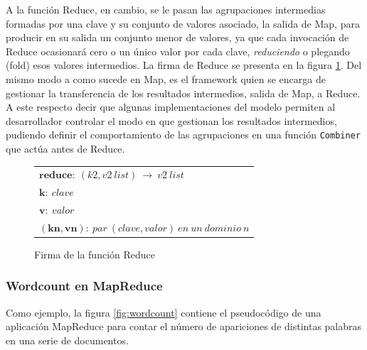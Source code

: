 A la funci\'on Reduce, en cambio, se le pasan las agrupaciones intermedias formadas por una clave y su conjunto de valores asociado, la salida de Map, para producir en su salida un conjunto menor de valores, ya que cada invocaci\'on de Reduce ocasionar\'a cero o un \'unico valor por cada clave, \emph{reduciendo} o plegando (fold) esos valores intermedios. La firma de Reduce se presenta en la figura \ref{fig:reduce}. Del mismo modo a como sucede en Map, es el framework quien se encarga de gestionar la transferencia de los resultados intermedios, salida de Map, a Reduce. A este respecto decir que algunas implementaciones del modelo permiten al desarrollador controlar el modo en que gestionan los resultados intermedios, pudiendo definir el comportamiento de las agrupaciones en una funci\'on \texttt{Combiner} que act\'ua antes de Reduce.

\begin{figure}[tbp]
\begin{center}
\begin{tabular}{|l|}
\hline
$\mathbf{reduce:} \: \left( k2,v2 \: list \right) \: \rightarrow \: v2 \: list$ \\
$\mathbf{k:} \: clave$ \\
$\mathbf{v:} \: valor$ \\
$\mathbf{\left(kn,vn \right):} \: par \: \left(clave,valor\right) \: en \: un \: dominio \: n$ \\
\hline
\end{tabular}
\caption{Firma de la funci\'on Reduce}
\label{fig:reduce}
\end{center}
\end{figure}


\subsubsection{Wordcount en MapReduce}\label{subsubsec:wordcount}
\noindent Como ejemplo, la figura \ref{fig:wordcount} contiene el pseudoc\'odigo de una aplicaci\'on MapReduce para contar el n\'umero de apariciones de distintas palabras en una serie de documentos.\newline

